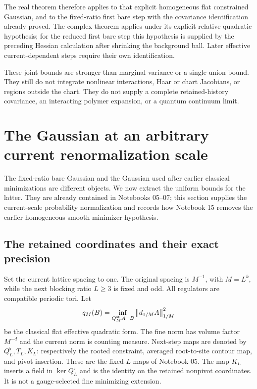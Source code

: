 \documentclass[11pt]{article}
\theoremstyle{remark}
\newcommand{\norm}[1]{\left\|#1\right\|}
\begin{document}
The real theorem therefore applies to that explicit homogeneous
flat constrained Gaussian, and to the fixed-ratio first bare
step with the covariance identification already proved. The
complex theorem applies under its explicit relative quadratic
hypothesis; for the reduced first bare step this hypothesis is
supplied by the preceding Hessian calculation after shrinking
the background ball. Later effective current-dependent steps
require their own identification.

These joint bounds are stronger than marginal variance or a
single union bound. They still do not integrate nonlinear
interactions, Haar or chart Jacobians, or regions outside the
chart. They do not supply a complete retained-history covariance,
an interacting polymer expansion, or a quantum continuum limit.

\section{The Gaussian at an arbitrary current renormalization scale}
\label{cs-section}

The fixed-ratio bare Gaussian and the Gaussian used after earlier
classical minimizations are different objects. We now extract the
uniform bounds for the latter. They are already contained in
Notebooks 05--07; this section supplies the current-scale probability
normalization and records how Notebook 15 removes the earlier
homogeneous smooth-minimizer hypothesis.

\subsection{The retained coordinates and their exact precision}

Set the current lattice spacing to one. The original spacing is
$M^{-1}$, with $M=L^k$, while the next blocking ratio $L\ge3$ is fixed
and odd. All regulators are compatible periodic tori. Let
\[
 q_M(B)=\inf_{Q_M^{\rm st}A=B}\norm{d_{1/M}A}_{1/M}^2
\]
be the classical flat effective quadratic form. The fine norm has
volume factor $M^{-d}$ and the current norm is counting measure.
Next-step maps are denoted by $Q_L^\flat,T_L,K_L$: respectively the
rooted constraint, averaged root-to-site contour map, and pivot
insertion. These are the fixed-$L$ maps of Notebook 05. The map
$K_L$ inserts a field in $\ker Q_L^\flat$ and is the identity on
the retained nonpivot coordinates. It is not a gauge-selected
fine minimizing extension.
\end{document}
